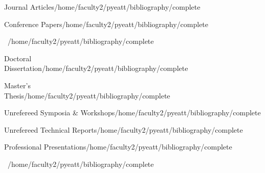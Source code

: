 \documentclass[11pt]{resume}
\begin{document}

\newcommand{\bibfile}{/home/faculty2/pyeatt/bibliography/complete}



\begin{citations}{Journal Articles}{\bibfile}
\tenure \nocite{Pyeatt:Howe:J00}
\end{citations}


\begin{citations}{Conference Papers}{\bibfile}
\tenure \nocite{Moore:Quasny:Pyeatt:Sinzinger:C01b}
\nocite{Pyeatt:Howe:C01a}
\nocite{Pyeatt:Howe:C99c}
\end{citations}
\vspace*{-2\baselineskip}
\begin{citations}{\ }{\bibfile}
\nocite{Pyeatt:Howe:C99a}
\nocite{Pyeatt:Howe:C98b}
\nocite{Pyeatt:Howe:C98a}
\nocite{Howe:Pyeatt:C96}
\nocite{Gruau:Whitley:Pyeatt:C96}
\nocite{Whitley:Gruau:Pyeatt:C95}
\nocite{Whitley:Mathias:Pyeatt:C95}
\nocite{Pyeatt:Oldham:C91}
\end{citations}

\begin{citations}{Doctoral \\ Dissertation}{\bibfile}
\nocite{PyeattTHESIS}
\end{citations}

\begin{citations}{Master's \\ Thesis}{\bibfile}
\nocite{Pyeatt:91}
\end{citations}

\begin{citations}{Unrefereed Symposia \&
Workshops}{\bibfile}
\nocite{Pyeatt:Howe:WS99a}
\nocite{Pyeatt:Howe:FS98}
\end{citations}

\begin{citations}{Unrefereed Technical Reports}{\bibfile}
\nocite{Pyeatt:Howe:TR98c}
\nocite{Stevens:Pyeatt:Houlton:Goss:95}
\end{citations}

\begin{citations}{Professional Presentations}{\bibfile}
\tenure \nocite{Present01a}
\nocite{Present00a}
\nocite{Present99c}
\end{citations}
\vspace*{-2\baselineskip}
\begin{citations}{\ }{\bibfile}
\nocite{Present99b}
\nocite{Present99a}
\nocite{Present98c}
\nocite{Present98b}
\nocite{Present98a}
\nocite{Present97}
\nocite{Present96}
\nocite{Present91}
\end{citations}
\end{document}
